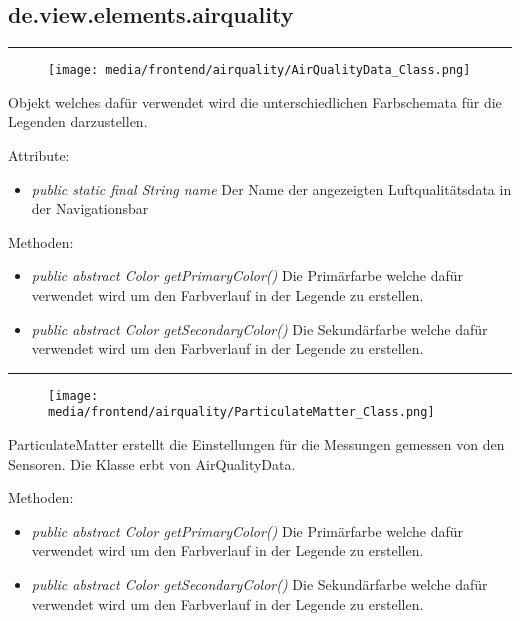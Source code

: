 \subsection{de.view.elements.airquality}

\rule{\textwidth}{0.4pt} 
\begin{minipage}{0.3\textwidth}
    \begin{figure}[H]
        \texttt{[image: media/frontend/airquality/AirQualityData\_Class.png]}
    \end{figure}
    \end{minipage} \hfill
    \begin{minipage}{0.6\textwidth}
Objekt welches dafür verwendet wird die unterschiedlichen Farbschemata für die Legenden darzustellen.
\end{minipage}

Attribute:
\begin{itemize} 
    \item \emph{public static final String name} Der Name der angezeigten Luftqualitätsdata in der Navigationsbar
\end{itemize}
Methoden:
\begin{itemize} 
    \item \emph{public abstract Color getPrimaryColor()} Die Primärfarbe welche dafür verwendet wird um den Farbverlauf in der Legende zu erstellen.
	\item \emph{public abstract Color getSecondaryColor()} Die Sekundärfarbe welche dafür verwendet wird um den Farbverlauf in der Legende zu erstellen.
\end{itemize}

\rule{\textwidth}{0.4pt} 
\begin{minipage}{0.3\textwidth}
    \begin{figure}[H]
        \texttt{[image: media/frontend/airquality/ParticulateMatter\_Class.png]}
    \end{figure}
    \end{minipage} \hfill
    \begin{minipage}{0.6\textwidth}
ParticulateMatter erstellt die Einstellungen für die Messungen gemessen von den Sensoren. Die Klasse erbt von AirQualityData.
\end{minipage}

Methoden:
\begin{itemize} 
	\item \emph{public abstract Color getPrimaryColor()} Die Primärfarbe welche dafür verwendet wird um den Farbverlauf in der Legende zu erstellen.
	\item \emph{public abstract Color getSecondaryColor()} Die Sekundärfarbe welche dafür verwendet wird um den Farbverlauf in der Legende zu erstellen.
\end{itemize}

